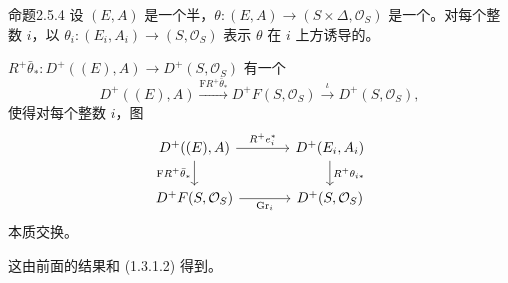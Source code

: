 \begin{SGAresult}{命题}{2.5.4}
设 $(E,A)$ 是一个半，$\theta:(E,A)\to(S\times\Delta,\mathcal O_S)$ 是一个。对每个整数 $i$，以 $\theta_i:(E_i,A_i)\to(S,\mathcal O_S)$ 表示 $\theta$ 在 $i$ 上方诱导的。

 $R^+\bar\theta_*:D^+((E),A)\to D^+(S,\mathcal O_S)$ 有一个
\[
D^+((E),A)\xrightarrow{\mathrm F R^+\bar\theta_*}D^+F(S,\mathcal O_S)
\xrightarrow{\iota}D^+(S,\mathcal O_S),
\]
使得对每个整数 $i$，图
\[
\begin{tikzcd}[column sep=large]
D^+((E),A)\arrow[r,"R^+e_i^*"]\arrow[d,"\mathrm F R^+\bar\theta_*"']&D^+(E_i,A_i)\arrow[d,"R^+\theta_{i*}"]\\
D^+F(S,\mathcal O_S)\arrow[r,"\operatorname{Gr}_i"']&D^+(S,\mathcal O_S)
\end{tikzcd}
\]
本质交换。
\end{SGAresult}
这由前面的结果和 (1.3.1.2) 得到。

